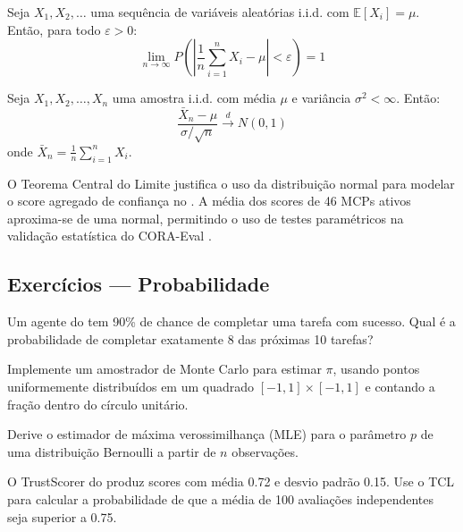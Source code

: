 \begin{teorema}
    Seja $X_1, X_2, \ldots$ uma sequência de variáveis aleatórias i.i.d.
    com $\mathbb{E}[X_i] = \mu$. Então, para todo $\varepsilon > 0$:
    \[
    \lim_{n \to \infty} P\left(\left|\frac{1}{n}\sum_{i=1}^n X_i - \mu\right|
    < \varepsilon\right) = 1
    \]
\end{teorema}

\begin{teorema}
    Seja $X_1, X_2, \ldots, X_n$ uma amostra i.i.d. com média $\mu$ e
    variância $\sigma^2 < \infty$. Então:
    \[
    \frac{\bar{X}_n - \mu}{\sigma / \sqrt{n}} \xrightarrow{d} N(0, 1)
    \]
    onde $\bar{X}_n = \frac{1}{n}\sum_{i=1}^n X_i$.
\end{teorema}

\begin{exemplo}
    O Teorema Central do Limite justifica o uso da distribuição normal para
    modelar o score agregado de confiança no \opencodeeco{}. A média dos
    scores de 46 MCPs ativos aproxima-se de uma normal, permitindo o uso de
    testes paramétricos na validação estatística do CORA-Eval
    \cite{laranjeira2026cora}.
\end{exemplo}

\subsection{Exercícios — Probabilidade}

\begin{exercicio}
    Um agente do \opencodeeco{} tem 90\% de chance de completar uma tarefa
    com sucesso. Qual é a probabilidade de completar exatamente 8 das
    próximas 10 tarefas?
\end{exercicio}

\begin{exercicio}
    Implemente um amostrador de Monte Carlo para estimar $\pi$, usando
    pontos uniformemente distribuídos em um quadrado $[-1,1] \times [-1,1]$
    e contando a fração dentro do círculo unitário.
\end{exercicio}

\begin{exercicio}
    Derive o estimador de máxima verossimilhança (MLE) para o parâmetro $p$
    de uma distribuição Bernoulli a partir de $n$ observações.
\end{exercicio}

\begin{exercicio}
    O TrustScorer do \opencodeeco{} produz scores com média 0.72 e desvio
    padrão 0.15. Use o TCL para calcular a probabilidade de que a média de
    100 avaliações independentes seja superior a 0.75.
\end{exercicio}

